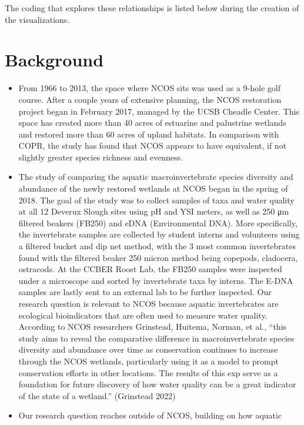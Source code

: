 \documentclass[
  letterpaper,
  DIV=11,
  numbers=noendperiod]{scrartcl}
\begin{document}
The coding that explores these relationships is listed below during the
creation of the visualizations.

\section{Background}\label{background}

\begin{itemize}
\item
  From 1966 to 2013, the space where NCOS sits was used as a 9-hole golf
  course. After a couple years of extensive planning, the NCOS
  restoration project began in February 2017, managed by the UCSB
  Cheadle Center. This space has created more than 40 acres of estuarine
  and palustrine wetlands and restored more than 60 acres of upland
  habitats. In comparison with COPR, the study has found that NCOS
  appears to have equivalent, if not slightly greater species richness
  and evenness.
\item
  The study of comparing the aquatic macroinvertebrate species diversity
  and abundance of the newly restored wetlands at NCOS began in the
  spring of 2018. The goal of the study was to collect samples of taxa
  and water quality at all 12 Deverux Slough sites using pH and YSI
  meters, as well as 250 μm filtered beakers (FB250) and eDNA
  (Environmental DNA). More specifically, the invertebrate samples are
  collected by student interns and volunteers using a filtered bucket
  and dip net method, with the 3 most common invertebrates found with
  the filtered beaker 250 micron method being copepods, cladocera,
  ostracods. At the CCBER Roost Lab, the FB250 samples were inspected
  under a microscope and sorted by invertebrate taxa by interns. The
  E-DNA samples are lastly sent to an external lab to be further
  inspected. Our research question is relevant to NCOS because aquatic
  invertebrates are ecological bioindicators that are often used to
  measure water quality. According to NCOS researchers Grinstead,
  Huitema, Norman, et al., ``this study aims to reveal the comparative
  difference in macroinvertebrate species diversity and abundance over
  time as conservation continues to increase through the NCOS wetlands,
  particularly using it as a model to prompt conservation efforts in
  other locations. The results of this exp \eriment serve as a
  foundation for future discovery of how water quality can be a great
  indicator of the state of a wetland.'' (Grinstead 2022)
\item
  Our research question reaches outside of NCOS, building on how aquatic

\end{itemize}
\end{document}
